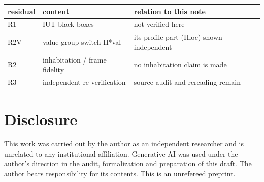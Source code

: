 \documentclass[11pt]{article}
\theoremstyle{definition}
\begin{document}
\begin{center}
\begin{tabular}{lll}
\toprule
residual & content & relation to this note\\
\midrule
R1 & IUT black boxes & not verified here\\
R2V & value-group switch H*val &
its profile part (Hloc) shown independent\\
R2 & inhabitation / frame fidelity &
no inhabitation claim is made\\
R3 & independent re-verification &
source audit and rereading remain\\
\bottomrule
\end{tabular}
\end{center}

\section*{Disclosure}

This work was carried out by the author as an independent
researcher and is unrelated to any institutional affiliation.
Generative AI was used under the author's direction in the
audit, formalization and preparation of this draft.  The author
bears responsibility for its contents.  This is an unrefereed
preprint.
\end{document}
